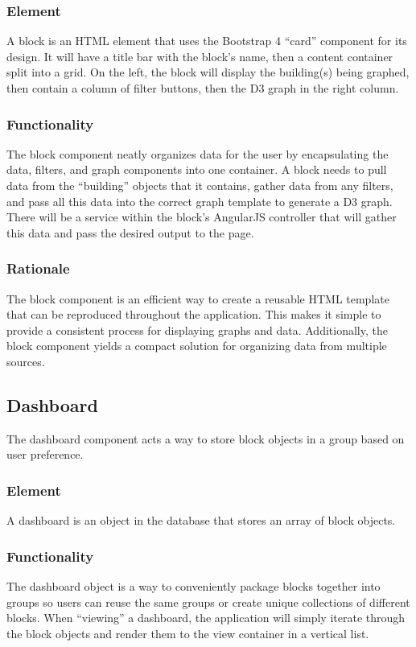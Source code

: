 \documentclass[journal,10pt,onecolumn,compsoc]{IEEEtran}
\begin{document}
    \subsubsection{Element} 
    A block is an HTML element that uses the Bootstrap 4 ``card'' component for its design. It will have a title bar with the block's name, then a content container split into a grid. On the left, the block will display the building(s) being graphed, then contain a column of filter buttons, then the D3 graph in the right column. 
    \subsubsection{Functionality}
    The block component neatly organizes data for the user by encapsulating the data, filters, and graph components into one container. A block needs to pull data from the ``building'' objects that it contains, gather data from any filters, and pass all this data into the correct graph template to generate a D3 graph. There will be a service within the block's AngularJS controller that will gather this data and pass the desired output to the page.
    \subsubsection{Rationale} 
    The block component is an efficient way to create a reusable HTML template that can be reproduced throughout the application. This makes it simple to provide a consistent process for displaying graphs and data. Additionally, the block component yields a compact solution for organizing data from multiple sources. 
    
    \subsection{Dashboard}
    The dashboard component acts a way to store block objects in a group based on user preference.
    \subsubsection{Element} 
    A dashboard is an object in the database that stores an array of block objects.
    \subsubsection{Functionality}
    The dashboard object is a way to conveniently package blocks together into groups so users can reuse the same groups or create unique collections of different blocks. When ``viewing'' a dashboard, the application will simply iterate through the block objects and render them to the view container in a vertical list.
\end{document}
